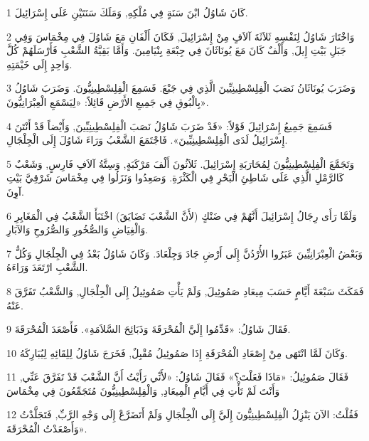 \par 1 كَانَ شَاوُلُ ابْنَ سَنَةٍ فِي مُلْكِهِ, وَمَلَكَ سَنَتَيْنِ عَلَى إِسْرَائِيلَ.
\par 2 وَاخْتَارَ شَاوُلُ لِنَفْسِهِ ثَلاَثَةَ آلاَفٍ مِنْ إِسْرَائِيلَ, فَكَانَ أَلْفَانِ مَعَ شَاوُلَ فِي مِخْمَاسَ وَفِي جَبَلِ بَيْتِ إِيلَ, وَأَلْفٌ كَانَ مَعَ يُونَاثَانَ فِي جِبْعَةِ بِنْيَامِينَ. وَأَمَّا بَقِيَّةُ الشَّعْبِ فَأَرْسَلَهُمْ كُلَّ وَاحِدٍ إِلَى خَيْمَتِهِ.
\par 3 وَضَرَبَ يُونَاثَانُ نَصَبَ الْفِلِسْطِينِيِّينَ الَّذِي فِي جَبْعَ. فَسَمِعَ الْفِلِسْطِينِيُّونَ. وَضَرَبَ شَاوُلُ بِالْبُوقِ فِي جَمِيعِ الأَرْضِ قَائِلاً: «لِيَسْمَعِ الْعِبْرَانِيُّونَ».
\par 4 فَسَمِعَ جَمِيعُ إِسْرَائِيلَ قَوْلاً: «قَدْ ضَرَبَ شَاوُلُ نَصَبَ الْفِلِسْطِينِيِّينَ, وَأَيْضاً قَدْ أَنْتَنَ إِسْرَائِيلُ لَدَى الْفِلِسْطِينِيِّينَ». فَاجْتَمَعَ الشَّعْبُ وَرَاءَ شَاوُلَ إِلَى الْجِلْجَالِ.
\par 5 وَتَجَمَّعَ الْفِلِسْطِينِيُّونَ لِمُحَارَبَةِ إِسْرَائِيلَ. ثَلاَثُونَ أَلْفَ مَرْكَبَةٍ, وَسِتَّةُ آلاَفِ فَارِسٍ, وَشَعْبٌ كَالرَّمْلِ الَّذِي عَلَى شَاطِئِ الْبَحْرِ فِي الْكَثْرَةِ. وَصَعِدُوا وَنَزَلُوا فِي مِخْمَاسَ شَرْقِيَّ بَيْتِ آوِنَ.
\par 6 وَلَمَّا رَأَى رِجَالُ إِسْرَائِيلَ أَنَّهُمْ فِي ضَنْكٍ (لأَنَّ الشَّعْبَ تَضَايَقَ) اخْتَبَأَ الشَّعْبُ فِي الْمَغَايِرِ وَالْغِيَاضِ وَالصُّخُورِ وَالصُّرُوحِ وَالآبَارِ.
\par 7 وَبَعْضُ الْعِبْرَانِيِّينَ عَبَرُوا الأُرْدُنَّ إِلَى أَرْضِ جَادَ وَجِلْعَادَ. وَكَانَ شَاوُلُ بَعْدُ فِي الْجِلْجَالِ وَكُلُّ الشَّعْبِ ارْتَعَدَ وَرَاءَهُ.
\par 8 فَمَكَثَ سَبْعَةَ أَيَّامٍ حَسَبَ مِيعَادِ صَمُوئِيلَ, وَلَمْ يَأْتِ صَمُوئِيلُ إِلَى الْجِلْجَالِ, وَالشَّعْبُ تَفَرَّقَ عَنْهُ.
\par 9 فَقَالَ شَاوُلُ: «قَدِّمُوا إِلَيَّ الْمُحْرَقَةَ وَذَبَائِحَ السَّلاَمَةِ». فَأَصْعَدَ الْمُحْرَقَةَ.
\par 10 وَكَانَ لَمَّا انْتَهَى مِنْ إِصْعَادِ الْمُحْرَقَةِ إِذَا صَمُوئِيلُ مُقْبِلٌ, فَخَرَجَ شَاوُلُ لِلِقَائِهِ لِيُبَارِكَهُ.
\par 11 فَقَالَ صَمُوئِيلُ: «مَاذَا فَعَلْتَ؟» فَقَالَ شَاوُلُ: «لأَنِّي رَأَيْتُ أَنَّ الشَّعْبَ قَدْ تَفَرَّقَ عَنِّي, وَأَنْتَ لَمْ تَأْتِ فِي أَيَّامِ الْمِيعَادِ, وَالْفِلِسْطِينِيُّونَ مُتَجَمِّعُونَ فِي مِخْمَاسَ
\par 12 فَقُلْتُ: الآنَ يَنْزِلُ الْفِلِسْطِينِيُّونَ إِلَيَّ إِلَى الْجِلْجَالِ وَلَمْ أَتَضَرَّعْ إِلَى وَجْهِ الرَّبِّ, فَتَجَلَّدْتُ وَأَصْعَدْتُ الْمُحْرَقَةَ».

